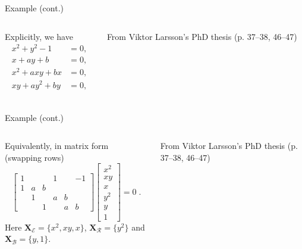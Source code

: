 \documentclass[aspectratio=169]{beamer}
\newcommand{\mat}[1]{\bm{#1}}
\newcommand{\XE}{\ensuremath{\mat{X}_\mathcal{E}}}
\newcommand{\XR}{\ensuremath{\mat{X}_\mathcal{R}}}
\newcommand{\XB}{\ensuremath{\mat{X}_\mathcal{B}}}
\begin{document}
\begin{frame}[t]{Example (cont.)}
\vspace{1cm}
\begin{columns}
    \begin{column}{0.7\textwidth}
        Explicitly, we have
        \begin{equation*}
            \begin{aligned}
            x^2 + y^2 -1 & = 0, \\
            x+ay+b & = 0, \\
            x^2+axy+bx & = 0, \\
            xy+ay^2 +by & = 0, \\
            \end{aligned}
        \end{equation*}
    \end{column}%
    \begin{column}{0.3\textwidth}
        \centering
        

        \vspace{5mm}

        {\scriptsize From Viktor Larsson's PhD thesis (p. 37--38, 46--47)}
    \end{column}
\end{columns}
\end{frame}

\begin{frame}[t]{Example (cont.)}
\vspace{1cm}
\begin{columns}
    \begin{column}{0.7\textwidth}
        Equivalently, in matrix form (swapping rows)
        \begin{equation*}
            \begin{bmatrix}
                1 &&&1&&-1 \\
                1&a&b\\
                &1&&a&b\\
                &&1&&a&b
            \end{bmatrix}
            \begin{bmatrix}
                x^2 \\ xy \\ x \\ y^2 \\ y \\ 1
            \end{bmatrix}
            = 0\;.
        \end{equation*}
    Here $\XE = \{x^2,xy,x\}$, $\XR=\{y^2\}$ and $\XB=\{y,1\}$.
    \end{column}%
    \begin{column}{0.3\textwidth}
        \centering
        

        \vspace{5mm}

        {\scriptsize From Viktor Larsson's PhD thesis (p. 37--38, 46--47)}
    \end{column}
\end{columns}
\end{frame}
\end{document}
